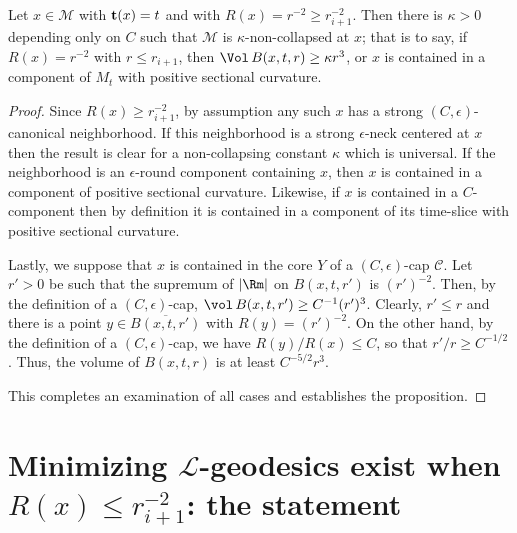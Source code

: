 \begin{proposition}[Non-collapsing at scales r<=r_{i+1} follows directly from canonical neighborhoods]
\label{prop:noncollapsing-small-scale-easy-case}
Let $x\in {\mathcal M}$ with ${\bf t}(x)=t$ and with $R(x)=r^{-2}\ge r_{i+1}^{-2}$. Then there is $\kappa>0$ depending only
on $C$  such that ${\mathcal M}$ is $\kappa$-non-collapsed at $x$; that is to say,
if $R(x)=r^{-2}$ with $r\le r_{i+1}$, then $\Vol\,B(x,t,r)\ge \kappa r^3$, or $x$ is contained in a component of $M_t$ with positive sectional curvature.
\end{proposition}

\begin{proof}
 Since
$R(x)\ge r_{i+1}^{-2}$, by assumption any such $x$ has a strong
$(C,\epsilon)$-canonical neighborhood. If this neighborhood is a
strong $\epsilon$-neck centered at $x$ then the result is clear for
a non-collapsing constant $\kappa$ which is universal. If the
neighborhood is an $\epsilon$-round component containing $x$, then
$x$ is contained in a component of positive sectional curvature. Likewise,
if $x$ is contained in a $C$-component then by definition it is contained in a component of its
time-slice with positive sectional curvature.


Lastly, we suppose that $x$ is contained in the core $Y$ of a
$(C,\epsilon)$-cap ${\mathcal C}$. Let $r'>0$ be such that the
supremum of $|\Rm|$ on $B(x,t,r')$ is $(r')^{-2}$.
Then, by the
definition
 of a $(C,\epsilon)$-cap,
$\vol\,B(x,t,r')\ge C^{-1}(r')^3$.
Clearly, $r'\le r$ and there is a point $y\in \overline{B(x,t,r')}$
with $R(y)=(r')^{-2}$. On the other hand, by the
definition of a $(C,\epsilon)$-cap, we have $R(y)/R(x)\le C$, so that $r'/r\ge C^{-1/2}$.
Thus, the
volume of $B(x,t,r)$ is at least $C^{-5/2}r^3$.

This completes an examination of all cases and establishes the
proposition.
\end{proof}



\section{Minimizing ${\mathcal L}$-geodesics exist when
$R(x)\le r^{-2}_{i+1}$: the statement}


